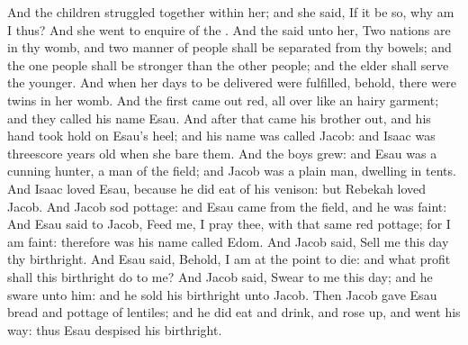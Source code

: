 \begin{biblechapter}
\verse And the children struggled together within her; and she said, If it be so, why am I thus? And she went to enquire of the \LORD.
\verse And the \LORD said unto her, Two nations are in thy womb, and two manner of people shall be separated from thy bowels; and the one people shall be stronger than the other people; and the elder shall serve the younger.
\verse And when her days to be delivered were fulfilled, behold, there were twins in her womb.
\verse And the first came out red, all over like an hairy garment; and they called his name Esau.
\verse And after that came his brother out, and his hand took hold on Esau's heel; and his name was called Jacob: and Isaac was threescore years old when she bare them.
\verse And the boys grew: and Esau was a cunning hunter, a man of the field; and Jacob was a plain man, dwelling in tents.
\verse And Isaac loved Esau, because he did eat of his venison: but Rebekah loved Jacob.
\verse And Jacob sod pottage: and Esau came from the field, and he was faint:
\verse And Esau said to Jacob, Feed me, I pray thee, with that same red pottage; for I am faint: therefore was his name called Edom.
\verse And Jacob said, Sell me this day thy birthright.
\verse And Esau said, Behold, I am at the point to die: and what profit shall this birthright do to me?
\verse And Jacob said, Swear to me this day; and he sware unto him: and he sold his birthright unto Jacob.
\verse Then Jacob gave Esau bread and pottage of lentiles; and he did eat and drink, and rose up, and went his way: thus Esau despised his birthright.
\end{biblechapter}

